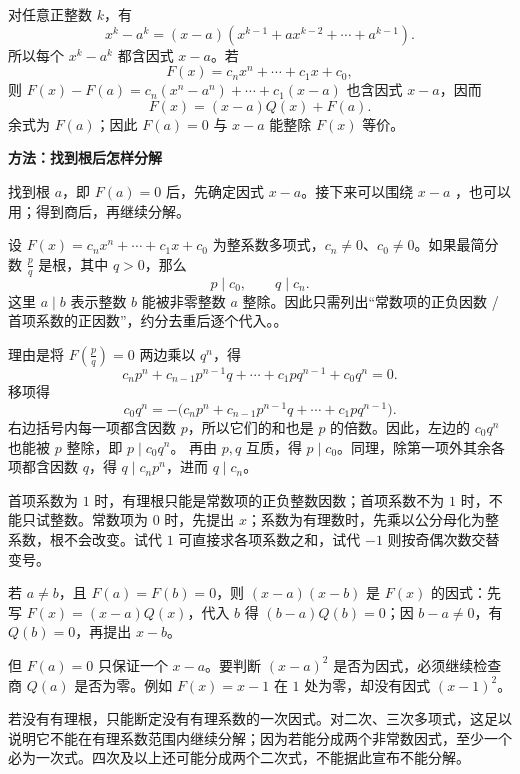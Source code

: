 对任意正整数 $k$，有
\[x^k-a^k=(x-a)(x^{k-1}+ax^{k-2}+\cdots+a^{k-1}).\]
所以每个 $x^k-a^k$ 都含因式 $x-a$。若
\[F(x)=c_nx^n+\cdots+c_1x+c_0,\]
则 $F(x)-F(a)=c_n(x^n-a^n)+\cdots+c_1(x-a)$ 也含因式 $x-a$，因而
\[F(x)=(x-a)Q(x)+F(a).\]
余式为 $F(a)$；因此 $F(a)=0$ 与 $x-a$ 能整除 $F(x)$ 等价。

\ifstudentnotes\else
\begin{tcolorbox}[knotweld,breakable=false]
\textbf{方法：找到根后怎样分解}\par\smallskip
找到根 $a$，即 $F(a)=0$ 后，先确定因式 $x-a$。接下来可以围绕 $x-a$ ，也可以用；得到商后，再继续分解。
\end{tcolorbox}
\fi

设 $F(x)=c_nx^n+\cdots+c_1x+c_0$ 为整系数多项式，$c_n\ne0$、$c_0\ne0$。如果最简分数 $\frac pq$ 是根，其中 $q>0$，那么
\[p\mid c_0,\qquad q\mid c_n.\]
这里 $a\mid b$ 表示整数 $b$ 能被非零整数 $a$ 整除。因此只需列出“常数项的正负因数 / 首项系数的正因数”，约分去重后逐个代入。。

理由是将 $F\left(\frac pq\right)=0$ 两边乘以 $q^n$，得
\[c_np^n+c_{n-1}p^{n-1}q+\cdots+c_1pq^{n-1}+c_0q^n=0.\]
移项得
\[
c_0q^n=-\bigl(c_np^n+c_{n-1}p^{n-1}q+\cdots+c_1pq^{n-1}\bigr).
\]
右边括号内每一项都含因数 $p$，所以它们的和也是 $p$ 的倍数。因此，左边的 $c_0q^n$ 也能被 $p$ 整除，即 $p\mid c_0q^n$。
再由 $p,q$ 互质，得 $p\mid c_0$。同理，除第一项外其余各项都含因数 $q$，得 $q\mid c_np^n$，进而 $q\mid c_n$。

首项系数为 $1$ 时，有理根只能是常数项的正负整数因数；首项系数不为 $1$ 时，不能只试整数。常数项为 $0$ 时，先提出 $x$；系数为有理数时，先乘以公分母化为整系数，根不会改变。试代 $1$ 可直接求各项系数之和，试代 $-1$ 则按奇偶次数交替变号。

若 $a\ne b$，且 $F(a)=F(b)=0$，则 $(x-a)(x-b)$ 是 $F(x)$ 的因式：先写 $F(x)=(x-a)Q(x)$，代入 $b$ 得 $(b-a)Q(b)=0$；因 $b-a\ne0$，有 $Q(b)=0$，再提出 $x-b$。

但 $F(a)=0$ 只保证一个 $x-a$。要判断 $(x-a)^2$ 是否为因式，必须继续检查商 $Q(a)$ 是否为零。例如 $F(x)=x-1$ 在 $1$ 处为零，却没有因式 $(x-1)^2$。

若没有有理根，只能断定没有有理系数的一次因式。对二次、三次多项式，这足以说明它不能在有理系数范围内继续分解；因为若能分成两个非常数因式，至少一个必为一次式。四次及以上还可能分成两个二次式，不能据此宣布不能分解。

